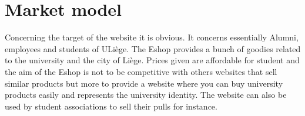 \documentclass{article}
\begin{document}
\section{Market model}
Concerning the target of the website it is obvious. It concerns essentially Alumni, employees and students of ULiège. The Eshop provides a bunch of goodies related to the university and the city of Liège. Prices given are affordable for student and the aim of the Eshop is not to be competitive with others websites that sell similar products but more to provide a website where you can buy university products easily and represents the university identity. The website can also be used by student associations to sell their pulls for instance.
\end{document}
